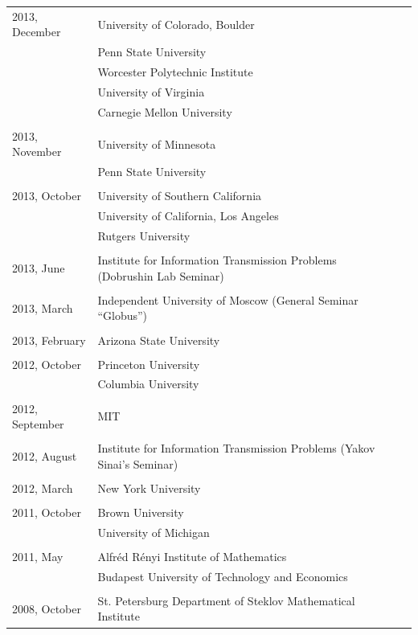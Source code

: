 \documentclass[letterpaper,11pt]{article}
\begin{document}
\begin{longtable}{llc}
	2013, December
	& University of Colorado, Boulder
	\\&Penn State University\\&Worcester Polytechnic Institute
	\\&University of Virginia\\&
	Carnegie Mellon University \\\\

	2013, November&
	University of Minnesota \\&
	Penn State University \\\\

	2013, October&
	University of Southern California
	\\&
	University of California, Los Angeles
	\\&Rutgers University\\\\

	2013, June& Institute for Information Transmission Problems
	(Dobrushin Lab Seminar)\\\\

	2013, March& Independent University of Moscow (General Seminar
	``Globus'')\\\\

	2013, February & Arizona State University\\\\

	2012, October & Princeton University \\
	& Columbia University\\\\

	2012, September & MIT \\\\

	2012, August
	& Institute for Information Transmission Problems
	(Yakov Sinai's Seminar)
	\\\\

	2012, March & New York University\\\\

	2011, October & Brown University \\
	&University of Michigan
	\\
	\\
	2011, May& Alfr\'ed R\'enyi Institute of Mathematics
	\\
	& Budapest University of Technology and Economics
	\\\\

	2008, October &
	St. Petersburg Department of Steklov Mathematical
	Institute%
	\\
\end{longtable}
\bigskip
\end{document}
